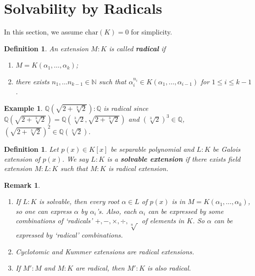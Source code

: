 \documentclass[11pt]{book}
\newtheorem{definition}[theorem]{Definition}
\newtheorem{example}[theorem]{Example}
\newtheorem{remark}[theorem]{Remark}
\begin{document}
\section{Solvability by Radicals} 
In this section, we assume $\mathrm{char}(K)=0$ for simplicity. 

\begin{definition} \label{def-radical}
    An extension $M:K$ is called {\bf radical} if 
    \begin{enumerate}
        \item $M=K(\alpha_{1},\dots, \alpha_{k})$;
        \item there exists $n_{1},\dots n_{k-1}\in \mathbb{N}$ such that $\alpha_{i}^{n_{i}}\in K(\alpha_{1},\dots, \alpha_{i-1})$ for $1 \leq i \le k-1$. 
    \end{enumerate}
\end{definition}

\begin{example}
    $\mathbb{Q}(\sqrt{2+\sqrt[3]{2}}):\mathbb{Q}$ is radical since $\mathbb{Q}(\sqrt{2+\sqrt[3]{2}})=\mathbb{Q}(\sqrt[3]{2},\sqrt{2+\sqrt[3]{2}})$ and $(\sqrt[3]{2})^{3}\in \mathbb{Q}$, $(\sqrt{2+\sqrt[3]{2}})^{2}\in \mathbb{Q}(\sqrt[3]{2})$. 
\end{example}

\begin{definition} \label{def-solvext}
    Let $p(x)\in K[x]$ be separable polynomial and $L:K$ be Galois extension of $p(x)$. We say $L:K$ is a {\bf solvable extension} if there exists field extension $ M:L:K$ such that $M:K$ is radical extension. 
\end{definition}

\begin{remark} \label{rmk-radical}
    \begin{enumerate}
        \item If $L:K$ is solvable, then every root $\alpha\in L$ of $p(x)$ is in $M=K(\alpha_{1},\dots, \alpha_{k})$, so one can express $\alpha$ by $\alpha_{i}$'s. Also, each $\alpha_{i}$ can be expressed by some combinations of `radicals' $+,-,\times, \div, \sqrt[n]{\,}$ of elements in $K$. So $\alpha$ can be expressed by `radical' combinations. 
        \item Cyclotomic and Kummer extensions are radical extensions. 
        \item If $M':M$ and $M:K$ are radical, then $M':K$ is also radical. 
    \end{enumerate}
\end{remark}
\end{document}
